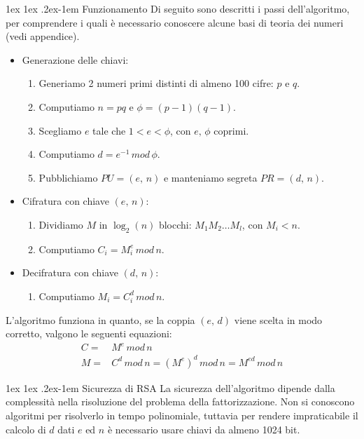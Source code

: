 \documentclass[a4paper, 11pt, twoside, openright, fleqn]{report}
\makeatletter
\renewcommand{\paragraph}{%
	\@startsection{paragraph}{4}%
	{\z@}{1ex \@plus 1ex \@minus .2ex}{-1em}%
	{\normalfont\normalsize\bfseries}%
}
\makeatother
\begin{document}
\paragraph{Funzionamento}
Di seguito sono descritti i passi dell'algoritmo, per comprendere i quali è necessario conoscere alcune basi di teoria dei numeri (vedi appendice).
\begin{itemize}
	\item Generazione delle chiavi:
	\begin{enumerate}
		\item Generiamo 2 numeri primi distinti di almeno 100 cifre: $p$ e $q$.
		\item Computiamo $n=pq$ e $\phi=(p-1)(q-1)$.
		\item Scegliamo $e$ tale che $1<e<\phi$, con $e,\,\phi$ coprimi.
		\item Computiamo $d=e^{-1}\,mod\,\phi$.
		\item Pubblichiamo $PU = (e,\,n)$ e manteniamo segreta $PR = (d,\,n)$.
	\end{enumerate}
	\item Cifratura con chiave $(e,\,n)$:
	\begin{enumerate}
		\item Dividiamo $M$ in $\log_2(n)$ blocchi: $M_1M_2\dots M_l$, con $M_i < n$.
		\item Computiamo $C_i = M_i^e\,mod\,n$.
	\end{enumerate}
	\item Decifratura con chiave $(d,\,n)$:
	\begin{enumerate}
		\item Computiamo $M_i = C_i^d\,mod\,n$.
	\end{enumerate}
\end{itemize}
L'algoritmo funziona in quanto, se la coppia $(e,\,d)$ viene scelta in modo corretto, valgono le seguenti equazioni:
\begin{align*}
	C =& M^e\,mod\,n\\
	M =& C^d\,mod\,n = (M^e)^d\,mod\,n = M^{ed}\,mod\,n
\end{align*}

\paragraph{Sicurezza di RSA}
La sicurezza dell'algoritmo dipende dalla complessità nella risoluzione del problema della fattorizzazione. Non si conoscono algoritmi per risolverlo in tempo polinomiale, tuttavia per rendere impraticabile il calcolo di $d$ dati $e$ ed $n$ è necessario usare chiavi da almeno 1024 bit.
\end{document}
